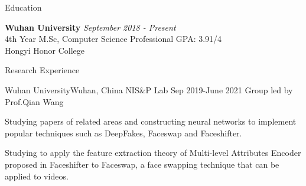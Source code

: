 \documentclass{resume} %
\begin{document}

\begin{rSection}{Education}

{\bf Wuhan University} \hfill {\em September 2018 - Present} 
\\ 4th Year M.Sc, Computer Science \hfill { Professional GPA: 3.91/4}
\\  Hongyi Honor College
\\



\end{rSection}




\begin{rSection}{Research Experience}

\begin{rSubsection}{Wuhan University}{Wuhan, China}
{NIS\&P Lab}
{Sep 2019-June 2021}
{Group led by Prof.Qian Wang}
 \item Studying papers of related areas and constructing neural networks to implement popular techniques such
as DeepFakes, Faceswap and Faceshifter.
 \item Studying to apply the feature extraction theory of Multi-level Attributes Encoder proposed in
Faceshifter to Faceswap, a face swapping technique that can be applied to videos.
\end{rSubsection}

\end{rSection}
\end{document}
